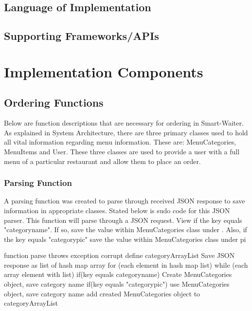 \documentclass[12pt, titlepage]{article}
\begin{document}
\subsection{Language of Implementation}
\subsection{Supporting Frameworks/APIs}

\section{Implementation Components}

\subsection{Ordering Functions}
Below are function descriptions that are necessary for ordering in Smart-Waiter. As explained in System Architecture, there are three primary classes used to hold all vital information regarding menu information. These are: MenuCategories, MenuItems and User. These three classes are used to provide a user with a full menu of a particular restaurant and allow them to place an order.

\subsubsection{Parsing Function}
A parsing function was created to parse through received JSON response to save information in appropriate classes. Stated below is sudo code for this JSON parser. This function will parse through a JSON request. View if the key equals "categoryname". If so, save the value within MenuCategories class under . Also, if the key equals "categorypic" save the value within MenuCategories  class under pi

	function parse throws exception corrupt		
		define categoryArrayList 
		Save JSON response as list of hash map array
        for (each element in hash map list) {
            while (each  array element with list) {
                if(key equals categoryname){
                    Create MenuCategories object, save category name
                }
                if(key equals "categorypic"){
                    use MenuCategories object, save category name
                }
            }
            add created MenuCategories object to categoryArrayList
        }


\subsubsection{}
\end{document}
